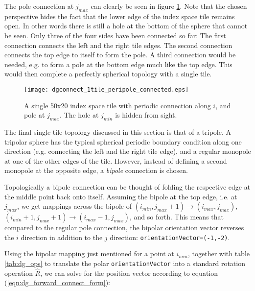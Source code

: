   
   The pole connection at $j_{max}$ can clearly be seen in figure 
   \ref{fig:dgconnect_1tile_peripole_connected}. Note that the chosen perspective 
   hides the fact that the lower edge of the index space tile remains open.
   In other words there is still a hole at the bottom of the sphere that cannot
   be seen. Only three of the four sides have been connected so far: 
   The first connection
   connects the left and the right tile edges. The second connection connects
   the top edge to itself to form the pole. A third connection would be needed,
   e.g. to form a pole at the bottom edge much like the top edge.
   This would then complete a perfectly spherical topology with a single tile.
  
   \begin{figure}[h]
     \caption{A single 50x20 index space tile with periodic connection
      along $i$, and pole at $j_{max}$. The hole at $j_{min}$ is hidden from
      sight.}
     \centering
     \texttt{[image: dgconnect\_1tile\_peripole\_connected.eps]}
     \label{fig:dgconnect_1tile_peripole_connected}
   \end{figure}
  
  
   The final single tile topology discussed in this section is that of a tripole.
   A tripolar sphere has the typical spherical periodic boundary condition
   along one direction (e.g. connecting the left and the right tile edge), and a
   regular monopole at one of the other edges of the tile. However, instead
   of defining a second monopole at the opposite edge, a {\em bipole} connection
   is chosen.
  
   Topologically a bipole connection can be thought of folding the respective
   edge at the middle point back onto itself. Assuming the bipole at the top 
   edge, i.e. at $j_{max}$, we get mappings across the bipole of 
   $(i_{min}, j_{max}+1) \rightarrow (i_{max}, j_{max})$,
   $(i_{min}+1, j_{max}+1) \rightarrow (i_{max}-1, j_{max})$, and so forth. 
   This means that 
   compared to the regular pole connection, the bipolar orientation vector
   reverses the $i$ direction in addition to the $j$ direction: 
   {\tt orientationVector=(-1,-2)}.
  
   Using the bipolar mapping just mentioned for a point at $i_{min}$, together
   with table \ref{tab:dg_ops} to translate the polar {\tt orientationVector}
   into a standard rotation  operation $\hat R$, we can solve for the position
   vector according to equation (\ref{eqn:dg_forward_connect_form}):
   
